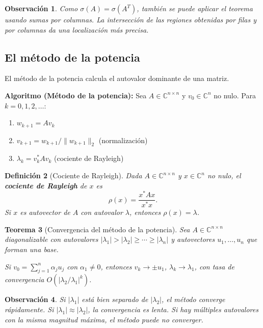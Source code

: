 \documentclass[a4paper,11pt]{report}
\newtheorem{theorem}{Teorema}[chapter]
\newtheorem{definition}[theorem]{Definición}
\newtheorem{remark}[theorem]{Observación}
\begin{document}
\begin{remark}
Como $\sigma(A) = \sigma(A^T)$, también se puede aplicar el teorema usando sumas por columnas. La intersección de las regiones obtenidas por filas y por columnas da una localización más precisa.
\end{remark}

\subsection{El método de la potencia}

El método de la potencia calcula el autovalor dominante de una matriz.

\textbf{Algoritmo (Método de la potencia):}
Sea $A \in \mathbb{C}^{n \times n}$ y $v_0 \in \mathbb{C}^n$ no nulo. Para $k = 0, 1, 2, \ldots$:
\begin{enumerate}
\item $w_{k+1} = Av_k$
\item $v_{k+1} = w_{k+1} / \|w_{k+1}\|_2$ \quad (normalización)
\item $\lambda_k = v_k^* A v_k$ \quad (cociente de Rayleigh)
\end{enumerate}

\begin{definition}[Cociente de Rayleigh]
Dada $A\in\mathbb{C}^{n\times n}$ y $x\in\mathbb{C}^n$ no nulo, el \textbf{cociente de Rayleigh} de $x$ es
\[
\rho(x) = \frac{x^* A x}{x^* x}.
\]
Si $x$ es autovector de $A$ con autovalor $\lambda$, entonces $\rho(x)=\lambda$.
\end{definition}

\begin{theorem}[Convergencia del método de la potencia]\label{thm:power_method}
Sea $A \in \mathbb{C}^{n \times n}$ diagonalizable con autovalores $|\lambda_1| > |\lambda_2| \geq \cdots \geq |\lambda_n|$ y autovectores $u_1, \ldots, u_n$ que forman una base.

Si $v_0 = \sum_{j=1}^n \alpha_j u_j$ con $\alpha_1 \neq 0$, entonces $v_k \to \pm u_1$, $\lambda_k \to \lambda_1$, con tasa de convergencia $O(|\lambda_2/\lambda_1|^k)$.
\end{theorem}

\begin{remark}
Si $|\lambda_1|$ está bien separado de $|\lambda_2|$, el método converge rápidamente. Si $|\lambda_1| \approx |\lambda_2|$, la convergencia es lenta. Si hay múltiples autovalores con la misma magnitud máxima, el método puede no converger.
\end{remark}
\end{document}
